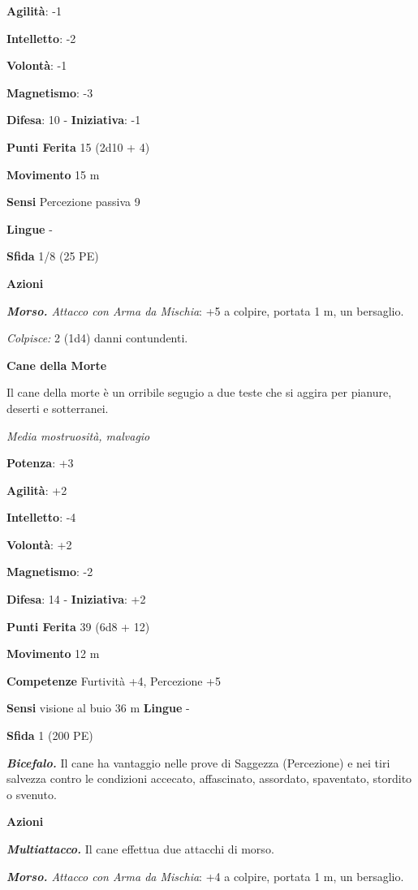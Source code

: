 \begin{multicols}{2}
\textbf{Agilità}: -1

\textbf{Intelletto}: -2

\textbf{Volontà}: -1

\textbf{Magnetismo}: -3

\textbf{Difesa}: 10 - \textbf{Iniziativa}: -1

\textbf{Punti Ferita} 15 (2d10 + 4)

\textbf{Movimento} 15 m

\textbf{Sensi} Percezione passiva 9

\textbf{Lingue} -

\textbf{Sfida} 1/8 (25 PE)\smallskip

\smallskip\textbf{Azioni}

\emph{\textbf{Morso.} Attacco con Arma da Mischia}: +5 a colpire,
portata 1 m, un bersaglio.

\emph{Colpisce:} 2 (1d4) danni contundenti.

\textbf{Cane della Morte}

Il cane della morte è un orribile segugio a due teste che si aggira per
pianure, deserti e sotterranei.

\emph{Media mostruosità, malvagio}

\textbf{Potenza}: +3

\textbf{Agilità}: +2

\textbf{Intelletto}: -4

\textbf{Volontà}: +2

\textbf{Magnetismo}: -2

\textbf{Difesa}: 14 - \textbf{Iniziativa}: +2

\textbf{Punti Ferita} 39 (6d8 + 12)

\textbf{Movimento} 12 m

\textbf{Competenze} Furtività +4, Percezione +5

\textbf{Sensi} visione al buio 36 m
\textbf{Lingue} -

\textbf{Sfida} 1 (200 PE)\smallskip

\emph{\textbf{Bicefalo.}} Il cane ha vantaggio nelle prove di Saggezza
(Percezione) e nei tiri salvezza contro le condizioni accecato,
affascinato, assordato, spaventato, stordito o svenuto.

\smallskip\textbf{Azioni}

\emph{\textbf{Multiattacco.}} Il cane effettua due attacchi di morso.

\emph{\textbf{Morso.} Attacco con Arma da Mischia}: +4 a colpire,
portata 1 m, un bersaglio.


\end{multicols}
